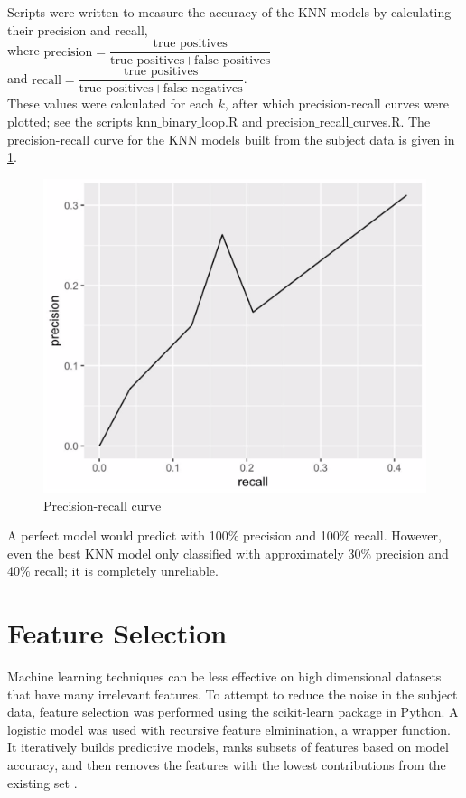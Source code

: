 \documentclass[12pt]{report}
\begin{document}
			Scripts were written to measure the accuracy of the KNN models by calculating their precision and recall,\\ where $ \text{precision} = \dfrac{\text{true positives}}{\text{true positives}+\text{false positives}} $ \\ and $ \text{recall} = \dfrac{\text{true positives}}{\text{true positives}+\text{false negatives}} $. \\ These values were calculated for each $k$, after which precision-recall curves were plotted; see the scripts knn$\_$binary$\_$loop.R and precision$\_$recall$\_$curves.R. The precision-recall curve for the KNN models built from the subject data is given in \ref{subjectdataprecisionrecall}.
			
			\begin{figure}[H]
				\centering
				\includegraphics[scale=0.4]{Images/subjectdata_precisionrecall.png}
				\caption{Precision-recall curve}
				\label{subjectdataprecisionrecall}
			\end{figure}
			
			A perfect model would predict with 100$\%$ precision and 100$\%$ recall. However, even the best KNN model only classified with approximately 30$\%$ precision and 40$\%$ recall; it is completely unreliable.
			
		\chapter{Feature Selection}
		Machine learning techniques can be less effective on high dimensional datasets that have many irrelevant features. To attempt to reduce the noise in the subject data, feature selection was performed using the scikit-learn package in Python. A logistic model was used with recursive feature elminination, a wrapper function. It iteratively builds predictive models, ranks subsets of features based on model accuracy, and then removes the features with the lowest contributions from the existing set \cite{paul_2018}.
		
\end{document}
